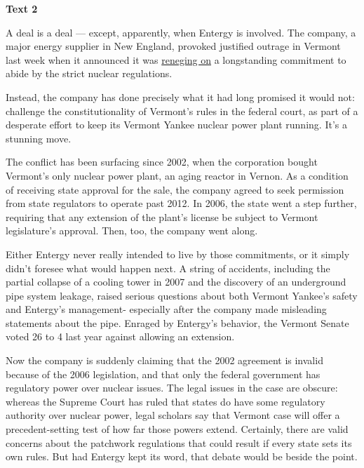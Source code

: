 
\begin{center}\textbf{Text 2}\end{center}

\qquad A deal is a deal --- except, apparently, when Entergy is involved. The company, a major energy supplier in New England, provoked justified outrage in Vermont last week when it announced it was \ul{reneging on} a longstanding commitment to abide by the strict nuclear regulations.

\qquad Instead, the company has done precisely what it had long promised it would not: challenge the constitutionality of Vermont's rules in the federal court, as part of a desperate effort to keep its Vermont Yankee nuclear power plant running. It's a stunning move.

\qquad The conflict has been surfacing since 2002, when the corporation bought Vermont's only nuclear power plant, an aging reactor in Vernon. As a condition of receiving state approval for the sale, the company agreed to seek permission from state regulators to operate past 2012. In 2006, the state went a step further, requiring that any extension of the plant's license be subject to Vermont legislature's approval. Then, too, the company went along.

\qquad Either Entergy never really intended to live by those commitments, or it simply didn't foresee what would happen next. A string of accidents, including the partial collapse of a cooling tower in 2007 and the discovery of an underground pipe system leakage, raised serious questions about both Vermont Yankee's safety and Entergy's management- especially after the company made misleading statements about the pipe. Enraged by Entergy's behavior, the Vermont Senate voted 26 to 4 last year against allowing an extension.

\qquad Now the company is suddenly claiming that the 2002 agreement is invalid because of the 2006 legislation, and that only the federal government has regulatory power over nuclear issues. The legal issues in the case are obscure: whereas the Supreme Court has ruled that states do have some regulatory authority over nuclear power, legal scholars say that Vermont case will offer a precedent-setting test of how far those powers extend. Certainly, there are valid concerns about the patchwork regulations that could result if every state sets its own rules. But had Entergy kept its word, that debate would be beside the point.

